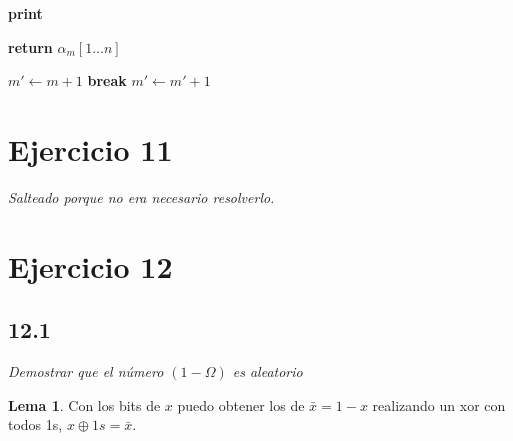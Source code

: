 \documentclass{article}
\theoremstyle{definition} %
\newtheorem{lemma}{Lema}
\newcommand{\firstn}[1]{\first{n}{#1}}
\newcommand{\first}[2]{#2[1 \dots #1]}
\begin{document}
\begin{algorithmic}

            \State \textbf{print} 
        \EndFor

    \EndFunction


            \State \textbf{return} $\firstn{\alpha_m}$
        \EndIf
    \EndFor

\EndFunction
        \State $m' \gets m + 1$
            \If{$\firstn{\alpha_m} \neq \firstn{\alpha_m'}$}
            \State \textbf{break}
            \EndIf
            \State $m' \gets m' + 1$
        \EndWhile
    \EndFunction
\end{algorithmic}

\section*{Ejercicio 11}

\textit{Salteado porque no era necesario resolverlo.}

\section*{Ejercicio 12}

\subsection*{12.1}

\textit{Demostrar que el número $(1 - \Omega)$ es aleatorio}

\begin{lemma}\label{lemma:xor-bits}
    Con los bits de $x$ puedo obtener los de $\bar{x} = 1 - x$ realizando un xor con
    todos 1s, $x \oplus 1s = \bar{x}$.
\end{lemma}
\end{document}
